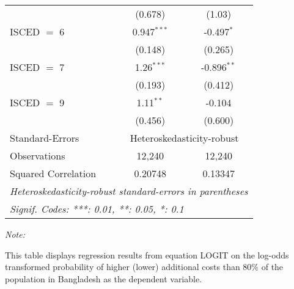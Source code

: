 \begin{table}[htbp!]
\begin{adjustbox}{width = 1\textwidth, max height = 0.95\textheight, center}
\begin{threeparttable}[b]
\begin{tabular}{lcc}
                                 & (0.678)        & (1.03)\\   
            ISCED $=$ 6          & 0.947$^{***}$  & -0.497$^{*}$\\   
                                 & (0.148)        & (0.265)\\   
            ISCED $=$ 7          & 1.26$^{***}$   & -0.896$^{**}$\\   
                                 & (0.193)        & (0.412)\\   
            ISCED $=$ 9          & 1.11$^{**}$    & -0.104\\   
                                 & (0.456)        & (0.600)\\   
            \midrule 
            Standard-Errors & \multicolumn{2}{c}{Heteroskedasticity-robust} \\ 
            Observations         & 12,240         & 12,240\\  
            Squared Correlation  & 0.20748        & 0.13347\\  
            \midrule \midrule
            \multicolumn{3}{l}{\emph{Heteroskedasticity-robust standard-errors in parentheses}}\\
            \multicolumn{3}{l}{\emph{Signif. Codes: ***: 0.01, **: 0.05, *: 0.1}}\\
         \end{tabular}
         
         \begin{tablenotes}\item \medskip \textit{Note:}
            \item This table displays regression results from equation LOGIT on the log-odds transformed probability of higher (lower) additional costs than 80\% of the population in Bangladesh as the dependent variable. 
         \end{tablenotes}
      \end{threeparttable}
   \end{adjustbox}
\end{table}


